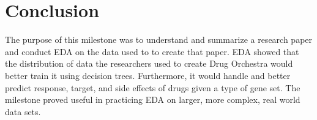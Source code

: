 \documentclass{article}
\begin{document}
\section{Conclusion}
The purpose of this milestone was to understand and summarize a research paper and conduct EDA on the data used to to create that paper. EDA showed that the distribution of data the researchers used to create Drug Orchestra would better train it using decision trees. Furthermore, it would handle and better predict response, target, and side effects of drugs given a type of gene set. The milestone proved useful in practicing EDA on larger, more complex, real world data sets.
\end{document}
